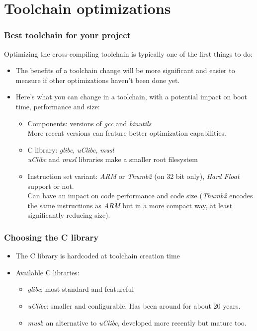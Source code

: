 \section{Toolchain optimizations}

\begin{frame}
\frametitle{Best toolchain for your project}
Optimizing the cross-compiling toolchain is typically one of the first
things to do:
\begin{itemize}
  \item The benefits of a toolchain change will be more significant and easier to
        measure if other optimizations haven't been done yet.
  \item Here's what you can change in a toolchain, with a potential
        impact on boot time, performance and size:
  \begin{itemize}
    \item Components: versions of {\em gcc} and {\em binutils}\\
	  More recent versions can feature better optimization capabilities.
    \item C library: {\em glibc}, {\em uClibc}, {\em musl}\\
	  {\em uClibc} and {\em musl} libraries make a smaller root
	  filesystem
    \item Instruction set variant: {\em ARM} or {\em Thumb2} (on 32 bit
          only), {\em Hard Float} support or not.\\
	  Can have an impact on code performance and code size ({\em Thumb2}
	  encodes the same instructions as {\em ARM} but in a more
	  compact way, at least significantly reducing size).
  \end{itemize}
\end{itemize}
\end{frame}

\begin{frame}
\frametitle{Choosing the C library}
\begin{itemize}
  \item The C library is hardcoded at toolchain creation time
  \item Available C libraries:
  \begin{itemize}
    \item {\em glibc}: most standard and featureful
    \item {\em uClibc}: smaller and configurable. Has been around for
	about 20 years.
    \item {\em musl}: an alternative to {\em uClibc}, developed more
        recently but mature too.
  \end{itemize}
\end{itemize}
\end{frame}

